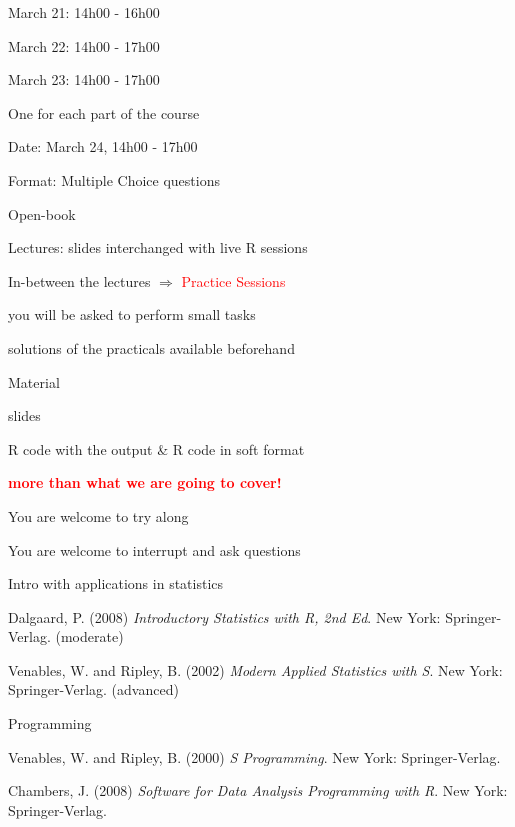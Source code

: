\documentclass{presentatiesmetlogo}
\newcommand{\red}[1]{\textcolor{red}{#1}}
\newcommand{\redbf}[1]{\textcolor{red}{\textbf{#1}}}
\newcommand{\R}{{\textsf{R} }}
\let \nl = \newline
\begin{document}
\item March 21: 14h00 - 16h00
\item March 22: 14h00 - 17h00
\item March 23: 14h00 - 17h00
\eitem
\bitem
\item One for each part of the course
\nl
\item Date: March 24, 14h00 - 17h00
\nl
\item Format: Multiple Choice questions
\nl
\item Open-book
\eitem
\bitem
\item Lectures: slides interchanged with live \R sessions
\nl
\item In-between the lectures $\Rightarrow$ \red{Practice Sessions}
\bitemt
\item you will be asked to perform small tasks
\item solutions of the practicals available beforehand
\nl
\eitemt
\item Material
\bitemt
\item slides
\item \R code with the output \& \R code in soft format
\item \redbf{more than what we are going to cover!}
\eitemt
\eitem
\bitem
\item You are welcome to try along
\nl
\item You are welcome to interrupt and ask questions
\eitem
\bitem
\item Intro with applications in statistics
\bitemt
\item Dalgaard, P. (2008) \emph{Introductory Statistics with R,
2nd Ed}. New York: Springer-Verlag. (moderate)
\item Venables, W. and Ripley, B. (2002) \emph{Modern Applied
Statistics with S}. New York: Springer-Verlag. (advanced)
\nl
\eitemt
\item Programming
\bitemt
\item Venables, W. and Ripley, B. (2000) \emph{S Programming}.
New York: Springer-Verlag.
\item Chambers, J. (2008) \emph{Software for Data Analysis
Programming with R}.  New York: Springer-Verlag.
\eitemt
\eitem
\end{document}
